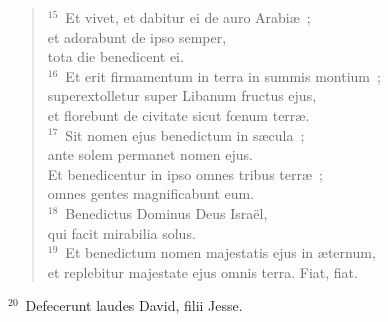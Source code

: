 \begin{flushleft}
\begin{verse}
${}^{15}$~Et vivet, et dabitur ei de auro Arabi\ae~;\\ et adorabunt de ipso semper,\\ tota die benedicent ei.\\
${}^{16}$~Et erit firmamentum in terra in summis montium~;\\ superextolletur super Libanum fructus ejus,\\ et florebunt de civitate sicut fœnum terr\ae .\\
${}^{17}$~Sit nomen ejus benedictum in s\ae cula~;\\ ante solem permanet nomen ejus.\\ Et benedicentur in ipso omnes tribus terr\ae~;\\ omnes gentes magnificabunt eum.\\
${}^{18}$~Benedictus Dominus Deus Isra\"el,\\ qui facit mirabilia solus.\\
${}^{19}$~Et benedictum nomen majestatis ejus in \ae ternum,\\ et replebitur majestate ejus omnis terra. Fiat, fiat.\end{verse}\end{flushleft}


${}^{20}$~Defecerunt laudes David, filii Jesse.

